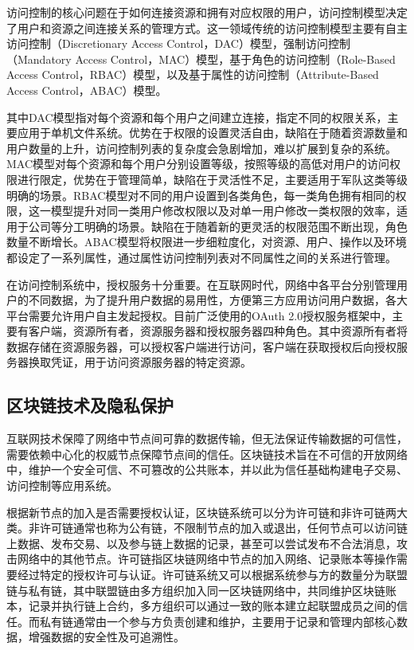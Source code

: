 访问控制的核心问题在于如何连接资源和拥有对应权限的用户，访问控制模型决定了用户和资源之间连接关系的管理方式。这一领域传统的访问控制模型主要有自主访问控制（Discretionary Access Control，DAC）模型，强制访问控制（Mandatory Access Control，MAC）模型，基于角色的访问控制（Role-Based Access Control，RBAC）模型，以及基于属性的访问控制（Attribute-Based Access Control，ABAC）模型。

其中DAC模型指对每个资源和每个用户之间建立连接，指定不同的权限关系，主要应用于单机文件系统。优势在于权限的设置灵活自由，缺陷在于随着资源数量和用户数量的上升，访问控制列表的复杂度会急剧增加，难以扩展到复杂的系统。MAC模型对每个资源和每个用户分别设置等级，按照等级的高低对用户的访问权限进行限定，优势在于管理简单，缺陷在于灵活性不足，主要适用于军队这类等级明确的场景。RBAC模型对不同的用户设置到各类角色，每一类角色拥有相同的权限，这一模型提升对同一类用户修改权限以及对单一用户修改一类权限的效率，适用于公司等分工明确的场景。缺陷在于随着新的更灵活的权限范围不断出现，角色数量不断增长。ABAC模型将权限进一步细粒度化，对资源、用户、操作以及环境都设定了一系列属性，通过属性访问控制列表对不同属性之间的关系进行管理。

在访问控制系统中，授权服务十分重要。在互联网时代，网络中各平台分别管理用户的不同数据，为了提升用户数据的易用性，方便第三方应用访问用户数据，各大平台需要允许用户自主发起授权。目前广泛使用的OAuth 2.0授权服务框架中，主要有客户端，资源所有者，资源服务器和授权服务器四种角色。其中资源所有者将数据存储在资源服务器，可以授权客户端进行访问，客户端在获取授权后向授权服务器换取凭证，用于访问资源服务器的特定资源。

\subsection{区块链技术及隐私保护}

互联网技术保障了网络中节点间可靠的数据传输，但无法保证传输数据的可信性，需要依赖中心化的权威节点保障节点间的信任。区块链技术旨在不可信的开放网络中，维护一个安全可信、不可篡改的公共账本，并以此为信任基础构建电子交易、访问控制等应用系统。

根据新节点的加入是否需要授权认证，区块链系统可以分为许可链和非许可链两大类。非许可链通常也称为公有链，不限制节点的加入或退出，任何节点可以访问链上数据、发布交易、以及参与链上数据的记录，甚至可以尝试发布不合法消息，攻击网络中的其他节点。许可链指区块链网络中节点的加入网络、记录账本等操作需要经过特定的授权许可与认证。许可链系统又可以根据系统参与方的数量分为联盟链与私有链，其中联盟链由多方组织加入同一区块链网络中，共同维护区块链账本，记录并执行链上合约，多方组织可以通过一致的账本建立起联盟成员之间的信任。而私有链通常由一个参与方负责创建和维护，主要用于记录和管理内部核心数据，增强数据的安全性及可追溯性。

